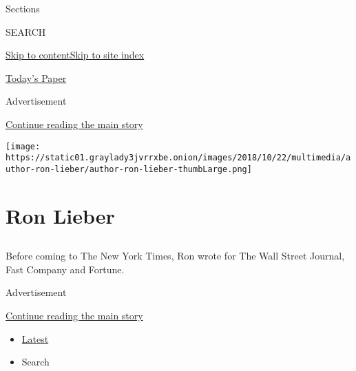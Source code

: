 Sections

SEARCH

\protect\hyperlink{site-content}{Skip to
content}\protect\hyperlink{site-index}{Skip to site index}

\href{https://myaccount.nytimes3xbfgragh.onion/auth/login?response_type=cookie\&client_id=vi}{}

\href{https://www.nytimes3xbfgragh.onion/section/todayspaper}{Today's
Paper}

Advertisement

\protect\hyperlink{after-top}{Continue reading the main story}

\texttt{[image: https://static01.graylady3jvrrxbe.onion/images/2018/10/22/multimedia/author-ron-lieber/author-ron-lieber-thumbLarge.png]}

\hypertarget{ron-lieber}{%
\section{Ron Lieber}\label{ron-lieber}}

\hypertarget{section}{%
\subsection{}\label{section}}

Before coming to The New York Times, Ron wrote for The Wall Street
Journal, Fast Company and Fortune.~

Advertisement

\protect\hyperlink{after-mid1}{Continue reading the main story}

\begin{itemize}
\tightlist
\item
  \protect\hyperlink{stream-panel}{Latest}
\item
  Search
\end{itemize}

